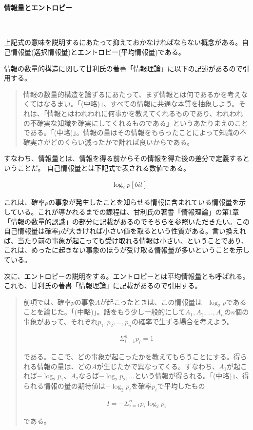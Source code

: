 \documentclass[dvipdfmx]{jsarticle}
\begin{document}
\paragraph{情報量とエントロピー}　\par
上記式の意味を説明するにあたって抑えておかなければならない概念がある。自己情報量(選択情報量)とエントロピー(平均情報量)である。\par
情報の数量的構造に関して甘利氏の著書「情報理論」\cite{amari01}に以下の記述があるので引用する。
\begin{quote}
  情報の数量的構造を論ずるにあたって、まず情報とは何であるかを考えなくてはなるまい。「(中略)」、すべての情報に共通な本質を抽象しよう。それは、「情報とはわれわれに何事かを教えてくれるものであり、われわれの不確実な知識を確実にしてくれるものである」というあたりまえのことである。「(中略)」。情報の量はその情報をもらったことによって知識の不確実さがどのくらい減ったかで計れば良いからである。
\end{quote}
すなわち、情報量とは、情報を得る前からその情報を得た後の差分で定義するということだ。
自己情報量とは下記式で表される数値である。
\begin{center}
  \begin{align*}
    -\log_2 p [bit]
  \end{align*}
\end{center}
これは、確率$p$の事象が発生したことを知らせる情報に含まれている情報量を示している。これが導かれるまでの課程は、甘利氏の著書「情報理論」\cite{amari01}の第1章「情報の数量的認識」の部分に記載があるのでそちらを参照いただきたい。この自己情報量は確率$p$が大きければ小さい値を取るという性質がある。言い換えれば、当たり前の事象が起こっても受け取れる情報は小さい、ということであり、これは、めったに起きない事象のほうが受け取る情報量が多いということを示している。\par
次に、エントロピーの説明をする。エントロピーとは平均情報量とも呼ばれる。これも、甘利氏の著書「情報理論」\cite{amari01}に記載があるので引用する。
\begin{quote}
  前項では、確率$p$の事象$A$が起こったときは、この情報量は$-\log_2 p$であることを論じた。「(中略)」。話をもう少し一般的にして$A_{1}, A_{2}, ..., A_{n}$の$n$個の事象があって、それぞれ$p_{1}, p_{2}, ..., p_{n}$の確率で生ずる場合を考えよう。
  \begin{center}
    \begin{align*}
        \Sigma_{i=1}^{n}p_{i} = 1
    \end{align*}
  \end{center}
  である。ここで、どの事象が起こったかを教えてもらうことにする。得られる情報の量は、どの$A$が生じたかで異なってくる。すなわち、$A_{1}$が起これば$-\log_2 p_{1}$、$A_{2}$ならば$-\log_2 p_{2}, ...$という情報が得られる。「(中略)」、得られる情報の量の期待値は$-\log_2 p_{i}$を確率$p_{i}$で平均したもの
  \begin{center}
    \begin{align*}
      I = -\Sigma_{i=1}^{n}p_{i}\log_2 p_{i}
    \end{align*}
  \end{center}
  である。
\end{quote}
\end{document}
